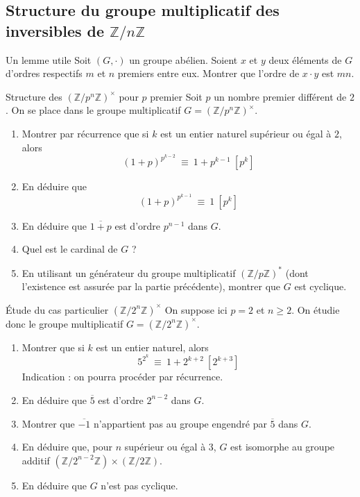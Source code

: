 \documentclass[french,a4paper]{article}
\newcommand{\Z}{\mathbb{Z}}
\newcommand{\st}{^*}
\theoremstyle{plain}
\theoremstyle{definition}
\theoremstyle{remark}
\begin{document}
\subsection{Structure du groupe multiplicatif des inversibles de $\Z/n\Z$}
\begin{ex}{Un lemme utile}
	Soit $(G,\cdot)$ un groupe abélien. Soient $x$ et $y$ deux éléments de $G$ d'ordres respectifs $m$ et $n$ premiers entre eux. Montrer que l'ordre de $x\cdot y$ est $mn$.
\end{ex}
\begin{ex}{Structure des $(\Z/p^n\Z)^\times$ pour $p$ premier}
	Soit $p$ un nombre premier différent de $2$. On se place dans le groupe multiplicatif $G=(\Z/p^n\Z)^\times$.
	\begin{enumerate}
		\item Montrer par récurrence que si $k$ est un entier naturel supérieur ou égal à $2$, alors $$(1+p)^{p^{k-2}}\ \equiv\ 1+p^{k-1}\ [p^k]$$ 
		\item En déduire que $$(1+p)^{p^{k-1}}\ \equiv\ 1\ [p^k]$$
		\item En déduire que $\overline{1+p}$ est d'ordre $p^{n-1}$ dans $G$.
		\item Quel est le cardinal de $G$ ?
		\item En utilisant un générateur du groupe multiplicatif $(\Z/p\Z)\st$ (dont l'existence est assurée par la partie précédente), montrer que $G$ est cyclique.
	\end{enumerate}
\end{ex}
\begin{ex}{Étude du cas particulier $(\Z/2^n\Z)^\times$}
	On suppose ici $p=2$ et $n\geqslant 2$. On étudie donc le groupe multiplicatif $G=(\Z/2^n\Z)^\times$.
	\begin{enumerate}
		\item Montrer que si $k$ est un entier naturel, alors $$5^{2^k}\ \equiv\ 1+2^{k+2}\ [2^{k+3}]$$ Indication : on pourra procéder par récurrence.
		\item En déduire que $\overline{5}$ est d'ordre $2^{n-2}$ dans $G$.
		\item Montrer que $\overline{-1}$ n'appartient pas au groupe engendré par $\overline{5}$ dans $G$.
		\item En déduire que, pour $n$ supérieur ou égal à $3$, $G$ est isomorphe au groupe additif $(\Z/2^{n-2}\Z)\times(\Z/2\Z)$.
		\item En déduire que $G$ n'est pas cyclique.
	\end{enumerate}
\end{ex}
\end{document}

